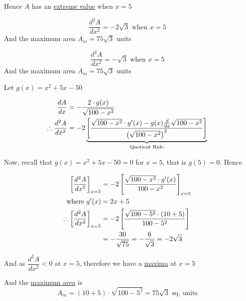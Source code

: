 \documentclass[14pt,fleqn]{extarticle}
\begin{document}
Hence $A$ has an \underline{extreme value} when $x=5$

\newcard 

\[ \frac{d^2 A}{dx^2} = -2\sqrt{3} \text{ when } x = 5 \]
And the maximum area $A_m = 75\sqrt{3}$ units 

\newcard 

\[ \frac{d^2 A}{dx^2} = -\sqrt{3} \text{ when } x = 5 \]
And the maximum area $A_m = 75\sqrt{3}$ units 

\newcard 


Let $g(x) = x^2 + 5x - 50$\newline 

\begin{align}
\frac{dA}{dx} &= -\frac{2\cdot g(x)}{\sqrt{100-x^2}}\\
\therefore \frac{d^2 A	}{dx^2} &= -2 \underbrace{\left[\frac{\sqrt{100-x^2} \cdot g'(x) - g(x) \frac{d}{dx}\sqrt{100-x^2}}{\left(\sqrt{100-x^2} \right)^2} \right]}_{\text{Quotient Rule}}
\end{align}

Now, recall that $g(x) = x^2 + 5x-50 = 0$ for $x = 5$, that is $g(5) = 0$. Hence 

\begin{align}
\left[ \frac{d^2 A}{dx^2}\right]_{x=5} &= -2 \left[\frac{\sqrt{100-x^2}\cdot g'(x)}{100-x^2} \right]_{x=5}\\
\text{where } g'(x) &= 2x + 5 \\ 
\therefore \left[ \frac{d^2 A}{dx^2}\right]_{x=5} &= -2 \left[\frac{\sqrt{100-5^2}\cdot (10 + 5)}{100 - 5^2}\right] \\
&= -\frac{30}{\sqrt{75}} = -\frac{6}{\sqrt{3}} = -2\sqrt{3} 
\end{align}

And as $\dfrac{d^2A}{dx^2} < 0$ at $x=5$, therefore we have a \underline{maxima} at $x=5$ 

And the \underline{maximum area} is  
\[ A_m = (10+5)\cdot \sqrt{100-5^2} = 75\sqrt{3}\text{ sq. units}\]
\end{document}
